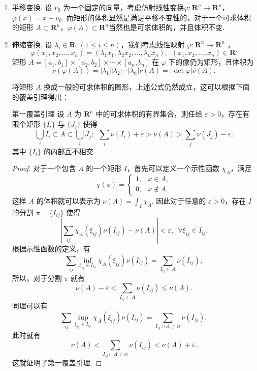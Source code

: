 \begin{enumerate}[label=(\arabic*)]
    \item 平移变换. 设 $v_0$ 为一个固定的向量，考虑仿射线性变换$\varphi\colon \mathbf{R}^n\to \mathbf{R}^n$，$\varphi(x) = x + v_0$. 而矩形的体积显然是满足平移不变性的，对于一个可求体积的矩形 $A\subset \mathbf{R}^n$，$\varphi(A)\subset \mathbf{R}^n$当然也是可求体积的，并且体积不变.

    \item 伸缩变换. 设 $\lambda_i\in\mathbf{R}\enspace(1\leqslant i\leqslant n)$，我们考虑线性映射 $\varphi\colon \mathbf{R}^n\to \mathbf{R}^n$ ，
          \[\varphi(x_1, x_2, \ldots, x_n) = (\lambda_1x_1, \lambda_2x_2, \ldots, \lambda_nx_n),\enspace (x_1, x_2, \ldots, x_n)\in \mathbf{R}^.\]
          矩形 $A = [a_1, b_1]\times [a_2, b_2]\times \cdots\times [a_n, b_n]$ 在 $\varphi$ 下的像仍为矩形，且体积为\[ \nu(\varphi(A)) = \vert\lambda_1\vert \vert\lambda_2\vert \cdots\vert\lambda_n\vert \nu(A) = \lvert \det\varphi\rvert \nu(A).\]

          将矩形 $A$ 换成一般的可求体积的图形，上述公式仍然成立，这可以根据下面的覆盖引理得出：

          \begin{lemma}{第一覆盖引理}{}
              设 $A$ 为 $\mathbf{R}^n$ 中的可求体积的有界集合，则任给 $\varepsilon > 0$，存在有限个矩形 $\{I_i\}$ 与 $\{J_j\}$ 使得
              \[\bigcup_i I_i\subset A\subset \bigcup_i J_j; \enspace \sum_i \nu(I_i) + \varepsilon > \nu(A) > \sum_j \nu(J_j) - \varepsilon.\]
              其中 $\{I_i\}$ 的内部互不相交.

          \end{lemma}

          \begin{proof}
              对于一个包含 $A$ 的一个矩形 $I$，首先可以定义一个示性函数 $\chi_A$，满足
              \[\chi(x) = \begin{cases}
                      1, & x\in A,    \\
                      0, & x\notin A.
                  \end{cases}\]
              这样 $A$ 的体积就可以表示为 $\nu(A) = \displaystyle\int_I\chi_A$. 因此对于任意的 $\varepsilon >0$，存在 $I$ 的分割 $\pi = \{I_{ij}\}$ 使得\[\left\lvert \sum_{ij}\chi_A(\xi_{ij})\nu(I_{ij}) - \nu(A)\right\rvert < \varepsilon,\enspace \forall \xi_{ij}\in I_{ij}.\]
              根据示性函数的定义，有 \[\sum_{ij}\inf_{\xi_{ij}\in I_{ij}}\chi_A(\xi_{ij})\nu(I_{ij}) = \sum_{I_{ij}\subset A}\nu(I_{ij}),\]
              所以，对于分割 $\pi$ 就有 \[\nu(A) - \varepsilon < \sum_{I_{ij}\subset A}\nu(I_{ij}) \leqslant \nu(A).\]
              同理可以有 \[\sum_{ij}\sup_{\xi_{ij}\in I_{ij}}\chi_A(\xi_{ij})\nu(I_{ij}) = \sum_{I_{ij}\cap A\neq \varnothing}\nu(I_{ij}),\]
              此时就有 \[\nu(A) < \sum_{I_{ij}\cap A\neq \varnothing}\nu(I_{ij}) < \nu(A) + \varepsilon.\]
              这就证明了第一覆盖引理.
          \end{proof}


\end{enumerate}

